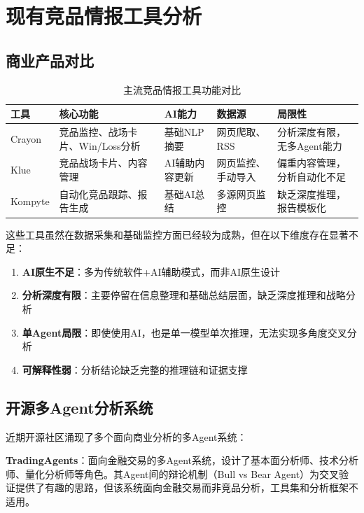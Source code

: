 \documentclass[12pt,a4paper]{ctexrep}
\begin{document}
\section{现有竞品情报工具分析}

\subsection{商业产品对比}

\begin{table}[H]
\centering
\caption{主流竞品情报工具功能对比}
\label{tab:ci-tools}
{\small
\begin{tabular}{p{2cm} p{3cm} p{3cm} p{2.5cm} p{2.5cm}}
\toprule
\textbf{工具} & \textbf{核心功能} & \textbf{AI能力} & \textbf{数据源} & \textbf{局限性} \\
\midrule
Crayon\cite{crayon2024} & 竞品监控、战场卡片、Win/Loss分析 & 基础NLP摘要 & 网页爬取、RSS & 分析深度有限，无多Agent能力 \\
\addlinespace
Klue\cite{klue2024} & 竞品战场卡片、内容管理 & AI辅助内容更新 & 网页监控、手动导入 & 偏重内容管理，分析自动化不足 \\
\addlinespace
Kompyte\cite{kompyte2024} & 自动化竞品跟踪、报告生成 & 基础AI总结 & 多源网页监控 & 缺乏深度推理，报告模板化 \\
\bottomrule
\end{tabular}
}
\end{table}

这些工具虽然在数据采集和基础监控方面已经较为成熟，但在以下维度存在显著不足：

\begin{enumerate}[leftmargin=2em]
\item \textbf{AI原生不足}：多为传统软件+AI辅助模式，而非AI原生设计
\item \textbf{分析深度有限}：主要停留在信息整理和基础总结层面，缺乏深度推理和战略分析
\item \textbf{单Agent局限}：即使使用AI，也是单一模型单次推理，无法实现多角度交叉分析
\item \textbf{可解释性弱}：分析结论缺乏完整的推理链和证据支撑
\end{enumerate}

\subsection{开源多Agent分析系统}

近期开源社区涌现了多个面向商业分析的多Agent系统：

\textbf{TradingAgents}\cite{tradingagents2025}：面向金融交易的多Agent系统，设计了基本面分析师、技术分析师、量化分析师等角色。其Agent间的辩论机制（Bull vs Bear Agent）为交叉验证提供了有趣的思路，但该系统面向金融交易而非竞品分析，工具集和分析框架不适用。
\end{document}
